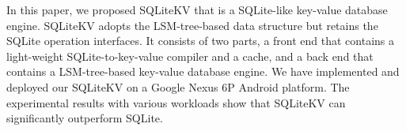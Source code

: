 In this paper, we proposed SQLiteKV that is a SQLite-like key-value database engine. SQLiteKV adopts the LSM-tree-based data structure but retains the SQLite operation interfaces. It consists of two parts, a front end that contains a light-weight SQLite-to-key-value compiler and a cache, and a back end that contains a LSM-tree-based key-value database engine. 
We have implemented and deployed our SQLiteKV on a Google Nexus 6P Android platform. The experimental results with various workloads show that SQLiteKV can significantly outperform SQLite. 